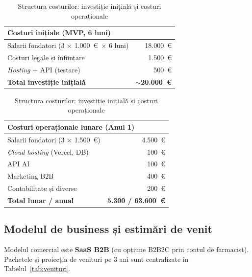 \begin{table}[H]
\centering
\small
\begin{tabular}{lr}
\toprule
\multicolumn{2}{l}{\textbf{Costuri inițiale (MVP, 6 luni)}} \\
\midrule
Salarii fondatori (3 $\times$ 1.000~\euro\ $\times$ 6 luni) & 18.000~\euro \\
Costuri legale și înființare                                 &  1.500~\euro \\
\textit{Hosting} + API (testare)                             &    500~\euro \\
\midrule
\textbf{Total investiție inițială}                           & \textbf{$\sim$20.000~\euro} \\
\bottomrule
\end{tabular}
\hspace{0.5cm}
\begin{tabular}{lr}
\toprule
\multicolumn{2}{l}{\textbf{Costuri operaționale lunare (Anul 1)}} \\
\midrule
Salarii fondatori (3 $\times$ 1.500~\euro)  & 4.500~\euro \\
\textit{Cloud hosting} (Vercel, DB)         &   100~\euro \\
API AI                                       &   100~\euro \\
Marketing B2B                                &   400~\euro \\
Contabilitate și diverse                     &   200~\euro \\
\midrule
\textbf{Total lunar / anual}                 & \textbf{5.300 / 63.600~\euro} \\
\bottomrule
\end{tabular}
\caption{Structura costurilor: investiție inițială și costuri operaționale}
\label{tab:costuri}
\end{table}

\subsection{Modelul de business și estimări de venit}

Modelul comercial este \textbf{SaaS B2B} (cu opțiune B2B2C prin contul de farmacist). Pachetele și proiecția de venituri pe 3 ani sunt centralizate în Tabelul~\ref{tab:venituri}.

